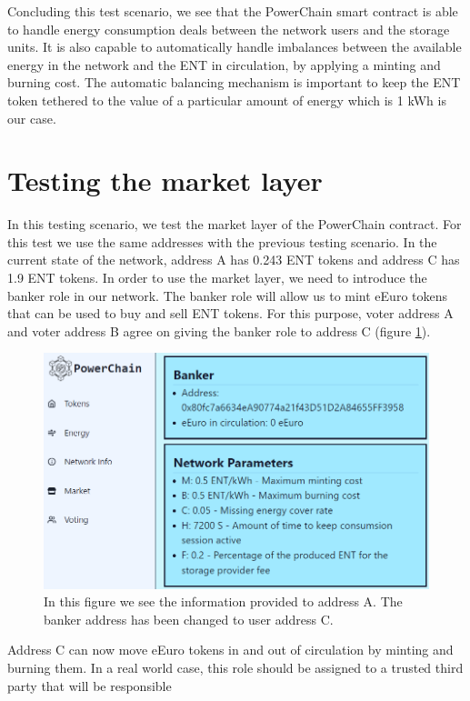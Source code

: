 Concluding this test scenario, we see that the PowerChain smart contract is able to handle energy consumption deals between the network users and the storage units. It is also capable to automatically 
handle imbalances between the available energy in the network and the ENT in circulation, by applying a minting and burning cost. The automatic balancing mechanism is important to keep the ENT token 
tethered to the value of a particular amount of energy which is 1 kWh is our case.

\section{Testing the market layer}
In this testing scenario, we test the market layer of the PowerChain contract. For this test we use the same addresses with the previous testing scenario. In the current state of the network,
address A has 0.243 ENT tokens and address C has 1.9 ENT tokens. In order to use the market layer, we need to introduce the banker role in our network. The banker role will allow us to mint 
eEuro tokens that can be used to buy and sell ENT tokens. For this purpose, voter address A and voter address B agree on giving the banker role to address C (figure \ref{fig:new_banker}).
\begin{figure}[h!]
    \centering
    \includegraphics[width=\linewidth,frame,scale=0.7]{Figures/change_banker.png}
    \caption{In this figure we see the information provided to address A. The banker address has been changed to user address C.}
    \label{fig:new_banker}
\end{figure}
Address C can now move eEuro tokens in and out of circulation by minting and burning them. In a real world case, this role should be assigned to a trusted third party that will be responsible
